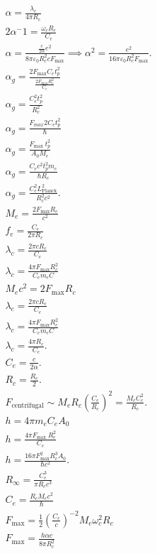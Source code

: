 \documentclass[a4paper,10pt]{article}
\begin{document}
\begin{gather*}
        \alpha = \frac{\lambda_c}{4 \pi R_c}\\
        2\alpha^-1=\frac{\omega_c R_c}{C_e}\\
        \alpha = \frac{\frac{c}{2 \alpha} e^2}{8 \pi \varepsilon_0 R_c^2 c F_{\text{max}}} \implies \alpha^2 = \frac{e^2}{16 \pi \varepsilon_0 R_c^2 F_{\text{max}}}.\\
        \alpha_g =  \frac{2F_{\text{max}} C_e t_p^2}{\frac{2F_{\text{max}} R_c^2}{C_e}}\\
        \alpha_g =\frac{C_e^2 t_p^2}{R_c^2}\\
        \alpha_g =\frac{F_{max} 2 C_e t_p^2}{\hbar}\\
        \alpha_g=\frac{F_{\text {max }} t_p^2}{A_0 M_e}\\
        \alpha_g = \frac{C_e c^2 t_p^2 m_e}{\hbar R_c}\\
        \alpha_g = \frac{C_e^2 L_{\text{Planck}}^2}{R_c^2 c^2}.\\
        M_e = \frac{2 F_{\text{max}} R_c}{c^2}\\
        f_e = \frac{C_e}{2 \pi R_c}\\
        \lambda_c=\frac{2 \pi c R_c}{C_e}\\
        \lambda_c=\frac{4 \pi F_{\max } R_c^2}{C_e m_e C}\\
        M_e c^2 =2 F_{\max } R_c\\
        \lambda_c=\frac{2 \pi c R_c}{C_e}\\
        \lambda_c =\frac{4 \pi F_{\max } R_c^2}{C_e m_e C}\\
        \lambda_c = \frac{4 \pi R_c}{C_e}.\\
        C_e = \frac{c}{2 \alpha}.\\
        R_c = \frac{R_e}{2}.\\
        F_{\text{centrifugal}} \sim M_e R_c \left(\frac{C_e}{R_c}\right)^2 = \frac{M_e C_e^2}{R_c}.\\
        h=4 \pi m_e C_e A_0\\
        h=\frac{4 \pi F_\text {max } R_e^2}{C_e}\\
        h = \frac{16 \pi F_\text{max}^2 R_c^3 A_0}{\hbar c^2}.\\
        R_\infty = \frac{C_e^3}{\pi R_c c^3}\\
        C_e = \frac{R_c M_e c^2}{\hbar}\\
        F_{\text{max}} = \frac{1}{2} \left( \frac{C_e}{c} \right)^{-2} M_e \omega_c^2 R_c\\
        F_{\text{max}} = \frac{h \alpha c}{8 \pi R_c^2}\\

\end{gather*}
\end{document}
